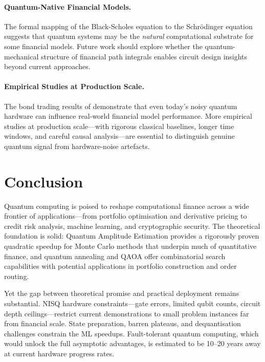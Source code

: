 \documentclass[12pt,a4paper]{article}
\begin{document}
\paragraph{Quantum-Native Financial Models.}
The formal mapping of the Black-Scholes equation to the Schrödinger equation \citep{schaden_quantum_2002, orus_quantum_2019} suggests that quantum systems may be the \emph{natural} computational substrate for some financial models. Future work should explore whether the quantum-mechanical structure of financial path integrals enables circuit design insights beyond current approaches.

\paragraph{Empirical Studies at Production Scale.}
The bond trading results of \citet{ciceri_enhanced_2025} demonstrate that even today's noisy quantum hardware can influence real-world financial model performance. More empirical studies at production scale---with rigorous classical baselines, longer time windows, and careful causal analysis---are essential to distinguish genuine quantum signal from hardware-noise artefacts.

\section{Conclusion}
\label{sec:conclusion}

Quantum computing is poised to reshape computational finance across a wide frontier of applications---from portfolio optimisation and derivative pricing to credit risk analysis, machine learning, and cryptographic security. The theoretical foundation is solid: Quantum Amplitude Estimation provides a rigorously proven quadratic speedup for Monte Carlo methods that underpin much of quantitative finance, and quantum annealing and QAOA offer combinatorial search capabilities with potential applications in portfolio construction and order routing.

Yet the gap between theoretical promise and practical deployment remains substantial. NISQ hardware constraints---gate errors, limited qubit counts, circuit depth ceilings---restrict current demonstrations to small problem instances far from financial scale. State preparation, barren plateaus, and dequantisation challenges constrain the ML speedups. Fault-tolerant quantum computing, which would unlock the full asymptotic advantages, is estimated to be 10--20 years away at current hardware progress rates.
\end{document}
